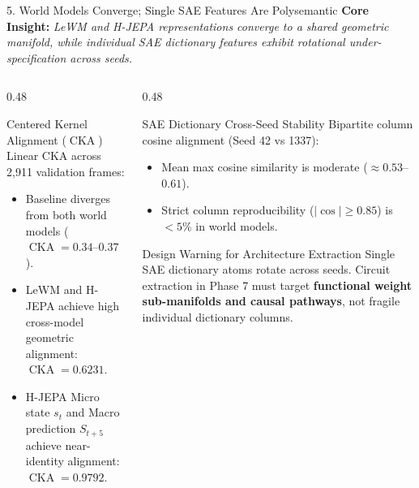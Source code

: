 \documentclass[aspectratio=169, 10pt]{beamer}
\begin{document}
\begin{frame}{5. World Models Converge; Single SAE Features Are Polysemantic}
  \textbf{Core Insight:} \textit{LeWM and H-JEPA representations converge to a shared geometric manifold, while individual SAE dictionary features exhibit rotational under-specification across seeds.}

  \vspace{0.2cm}
  \begin{columns}[T]
    \begin{column}{0.48\textwidth}
      \begin{block}{Centered Kernel Alignment ($\operatorname{CKA}$)}
        \small
        Linear CKA across 2,911 validation frames:
        \begin{itemize}
          \item Baseline diverges from both world models ($\operatorname{CKA} = 0.34$--$0.37$).
          \item LeWM and H-JEPA achieve high cross-model geometric alignment: $\operatorname{CKA} = \mathbf{0.6231}$.
          \item H-JEPA Micro state $s_t$ and Macro prediction $S_{t+5}$ achieve near-identity alignment: $\operatorname{CKA} = \mathbf{0.9792}$.
        \end{itemize}
      \end{block}
    \end{column}

    \begin{column}{0.48\textwidth}
      \begin{block}{SAE Dictionary Cross-Seed Stability}
        \scriptsize
        Bipartite column cosine alignment (Seed 42 vs 1337):
        \begin{itemize}
          \item Mean max cosine similarity is moderate ($\approx 0.53$--$0.61$).
          \item Strict column reproducibility ($|\cos| \ge 0.85$) is $<5\%$ in world models.
        \end{itemize}
      \end{block}
      \vspace{0.05cm}
      \begin{alertblock}{Design Warning for Architecture Extraction}
        \scriptsize
        Single SAE dictionary atoms rotate across seeds. Circuit extraction in Phase 7 must target \textbf{functional weight sub-manifolds and causal pathways}, not fragile individual dictionary columns.
      \end{alertblock}
    \end{column}
  \end{columns}
\end{frame}
\end{document}
